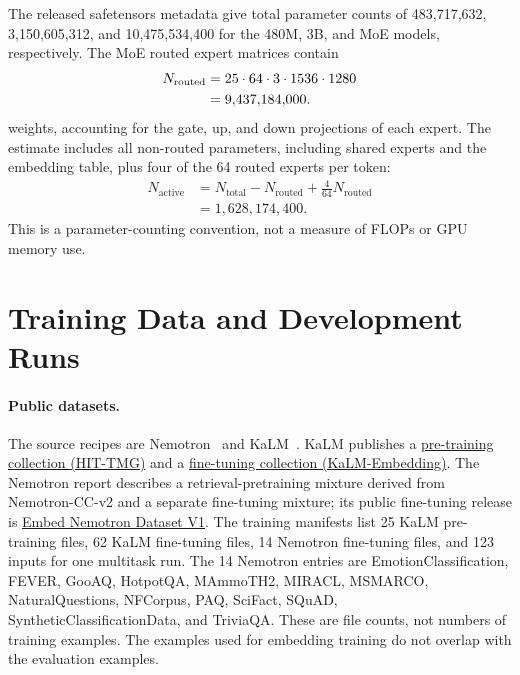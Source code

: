 \documentclass[11pt]{article}
\begin{document}
The released safetensors metadata give total parameter counts of 483,717,632, 3,150,605,312, and 10,475,534,400 for the 480M, 3B, and MoE models, respectively.
The MoE routed expert matrices contain
\begin{align}
N_{\mathrm{routed}} &= 25\cdot64\cdot3\cdot1536\cdot1280 \notag\\
&= 9{,}437{,}184{,}000.
\end{align}
weights, accounting for the gate, up, and down projections of each expert.
The estimate includes all non-routed parameters, including shared experts and the embedding table, plus four of the 64 routed experts per token:
\begin{align}
N_{\mathrm{active}} &= N_{\mathrm{total}}-N_{\mathrm{routed}}
 +\frac{4}{64}N_{\mathrm{routed}} \\
&=1{,}628{,}174{,}400.
\end{align}
This is a parameter-counting convention, not a measure of FLOPs or GPU memory use.

\section{Training Data and Development Runs}
\label{app:data}

\paragraph{Public datasets.}
The source recipes are Nemotron~\citep{babakhin2025nemotron} and KaLM~\citep{zhao2026kalm}.
KaLM publishes a \href{https://huggingface.co/datasets/HIT-TMG/KaLM-embedding-pretrain-data}{pre-training collection (HIT-TMG)} and a \href{https://huggingface.co/datasets/KaLM-Embedding/KaLM-embedding-finetuning-data}{fine-tuning collection (KaLM-Embedding)}.
The Nemotron report describes a retrieval-pretraining mixture derived from Nemotron-CC-v2 and a separate fine-tuning mixture; its public fine-tuning release is \href{https://huggingface.co/datasets/nvidia/embed-nemotron-dataset-v1}{Embed Nemotron Dataset V1}.
The training manifests list 25 KaLM pre-training files, 62 KaLM fine-tuning files, 14 Nemotron fine-tuning files, and 123 inputs for one multitask run.
The 14 Nemotron entries are EmotionClassification, FEVER, GooAQ, HotpotQA, MAmmoTH2, MIRACL, MSMARCO, NaturalQuestions, NFCorpus, PAQ, SciFact, SQuAD, SyntheticClassificationData, and TriviaQA.
These are file counts, not numbers of training examples.
The examples used for embedding training do not overlap with the evaluation examples.
\end{document}
